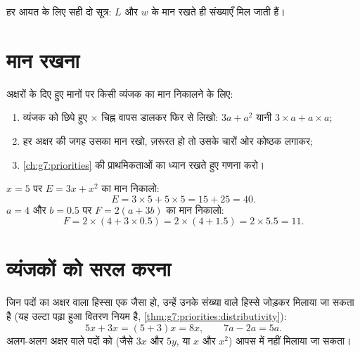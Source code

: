 \begin{omfigure}

{\small हर आयत के लिए सही दो सूत्र: $L$ और $w$ के मान रखते ही
संख्याएँ मिल जाती हैं।}
\end{omfigure}

\section{मान रखना}

\begin{method}[व्यंजक का मान निकालना]\label{met:g7:literal:substitute}
अक्षरों के दिए हुए मानों पर किसी व्यंजक का मान निकालने के लिए:
\begin{enumerate}
  \item व्यंजक को छिपे हुए $\times$ चिह्न वापस डालकर फिर से लिखो:
        $3a + a^2$ यानी $3 \times a + a \times a$;
  \item हर अक्षर की जगह उसका मान रखो, ज़रूरत हो तो उसके चारों ओर
        कोष्ठक लगाकर;
  \item \cref{ch:g7:priorities} की प्राथमिकताओं का ध्यान रखते हुए
        गणना करो।
\end{enumerate}
\end{method}

\begin{example}\label{ex:g7:literal:substitute}
$x = 5$ पर $E = 3x + x^2$ का मान निकालो:
\[
E = 3 \times 5 + 5 \times 5 = 15 + 25 = 40 .
\]
$a = 4$ और $b = 0.5$ पर $F = 2(a + 3b)$ का मान निकालो:
\[
F = 2 \times (4 + 3 \times 0.5) = 2 \times (4 + 1.5) = 2 \times 5.5
= 11 .
\]
\end{example}

\section{व्यंजकों को सरल करना}

\begin{proposition}[समान पदों को मिलाना]\label{prop:g7:literal:reduce}
जिन पदों का अक्षर वाला हिस्सा एक जैसा हो, उन्हें उनके संख्या वाले
हिस्से जोड़कर मिलाया जा सकता है (यह उल्टा पढ़ा हुआ वितरण नियम है,
\cref{thm:g7:priorities:distributivity}):
\[
5x + 3x = (5 + 3)x = 8x,
\qquad
7a - 2a = 5a .
\]
अलग-अलग अक्षर वाले पदों को (जैसे $3x$ और $5y$, या $x$ और $x^2$)
आपस में नहीं मिलाया जा सकता।
\end{proposition}

